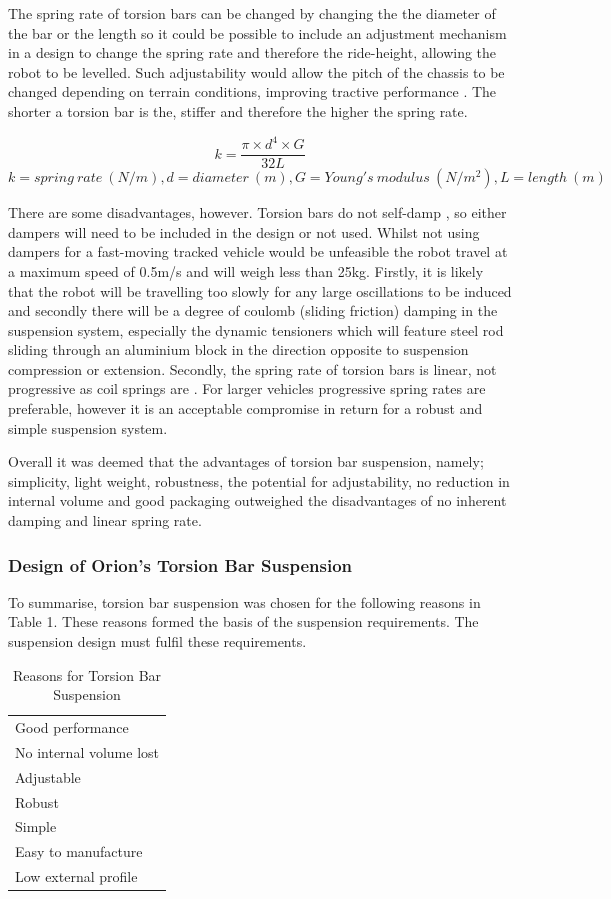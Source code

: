 The spring rate of torsion bars can be changed by changing the the diameter of the bar or the length so it could be possible to include an adjustment mechanism in a design to change the spring rate and therefore the ride-height, allowing the robot to be levelled. Such adjustability would allow the pitch of the chassis to be changed depending on terrain conditions, improving tractive performance \cite{Wong88}. The shorter a torsion bar is the, stiffer and therefore the higher the spring rate.

\[ k = \frac{ \pi\times d^4 \times G}{32L} \]
\[k = spring\:rate\:(N/m), d = diameter\:(m), G = Young's\:modulus\:(N/m^2), L = length\:(m)\]

There are some disadvantages, however. Torsion bars do not self-damp \cite{Hohl85}, so either dampers will need to be included in the design or not used. Whilst not using dampers for a fast-moving tracked vehicle would be unfeasible the robot travel at a maximum speed of 0.5m/s and will weigh less than 25kg. Firstly, it is likely that the robot will be travelling too slowly for any large oscillations to be induced and secondly there will be a degree of coulomb (sliding friction) damping \cite{Persson00} in the suspension system, especially the dynamic tensioners which will feature steel rod sliding through an aluminium block in the direction opposite to suspension compression or extension. Secondly, the spring rate of torsion bars is linear, not progressive as coil springs are \cite{Hohl85}. For larger vehicles progressive spring rates are preferable, however it is an acceptable compromise in return for a robust and simple suspension system.

Overall it was deemed that the advantages of torsion bar suspension, namely; simplicity, light weight, robustness, the potential for adjustability, no reduction in internal volume and good packaging outweighed the disadvantages of no inherent damping and linear spring rate. 


\subsubsection{Design of Orion's Torsion Bar Suspension}
To summarise, torsion bar suspension was chosen for the following reasons in Table 1. These reasons formed the basis of the suspension requirements. The suspension design must fulfil these requirements.
\begin{table}[h]
\centering
\begin{tabular}{l}
\hline
Good performance\\
No internal volume lost\\
Adjustable\\
Robust\\
Simple\\
Easy to manufacture\\
Low external profile\\
\hline
\end{tabular}
\caption{Reasons for Torsion Bar Suspension}
\end{table}

